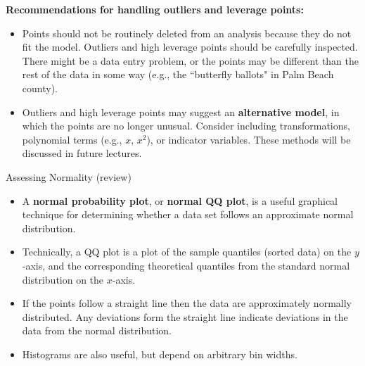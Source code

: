 \documentclass[10pt]{beamer}
\begin{document}
\begin{frame}
\textbf{Recommendations for handling outliers and leverage points:}
\vspace{5pt}
\begin{itemize}
\item Points should not be routinely deleted from an analysis because they do not fit the model.  Outliers and high leverage points should be carefully inspected.  There might be a data entry problem, or the points may be different than the rest of the data in some way (e.g., the ``butterfly ballots" in Palm Beach county).
\vspace{5pt}
\item Outliers and high leverage points may suggest an \textbf{alternative model}, in which the points are no longer unusual.  Consider including transformations, polynomial terms (e.g., $x$, $x^2$), or indicator variables.  These methods will be discussed in future lectures.
\end{itemize}
\end{frame}

% 

\begin{frame}{Assessing Normality (review)}
\begin{itemize}
\item A \textbf{normal probability plot}, or \textbf{normal QQ plot}, is a useful graphical technique for determining whether a data set follows an approximate normal distribution. 
\vspace{5pt}
\item Technically, a QQ plot is a plot of the sample quantiles (sorted data) on the $y$-axis, and the corresponding theoretical quantiles from the standard normal distribution on the $x$-axis.
\vspace{5pt}
\item If the points follow a straight line then the data are approximately normally distributed.  Any deviations form the straight line indicate deviations in the data from the normal distribution.
\vspace{5pt}
\item Histograms are also useful, but depend on arbitrary bin widths.  
\end{itemize}
\end{frame}
\end{document}

